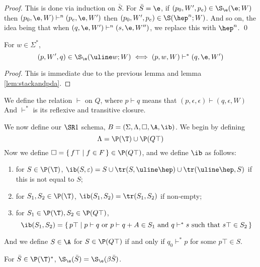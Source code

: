 \documentclass{llncs}
\begin{document}
\begin{proof}

    This is done via induction on $\bar S$.
    For $\bar S=\e$, if $(p_0,W',p_e)\in\S_\e(\e;W)$ then $(p_0,\e,W)\vdash^n(p_e,\e,W')$ then $(p_0,W',p_e)\in\S(\hep^n;W)$.
    And so on, the idea being that when $(q,\e,W')\vdash^n(s,\e,W'')$, we replace this with $\hep^n$.
    \qed

\end{proof}

\begin{lemma}

    For $w\in\Sigma^*$,
    $$ (p,W',q)\in\S_\e(\uline w;W) \iff (p,w,W)\vdash^*(q,\e,W') $$

\end{lemma}

\begin{proof}

    This is immediate due to the previous lemma and lemma \ref{lem:stackandpda}.

\end{proof}

We define the relation $\vdash$ on $Q$, where $p\vdash q$ means that $(p,\epsilon,\epsilon)\vdash(q,\epsilon,W)$
And $\vdash^*$ is its reflexive and transitive closure.

We now define our $\SR1$ schema, $B=(\Sigma,\Lambda,\square,\A,\ib)$.
We begin by defining
$$ \Lambda = \P(\T) \cup \P(Q\top) $$
Now we define $\square=\set{f\top}[f\in F]\in\P(Q\top)$, and we define $\ib$ as follows:
\begin{enumerate}
    \item for $S\in\P(\T)$, $\ib(S,\epsilon)=S\cup\tr(S,\uline\hep)\cup\tr(\uline\hep,S)$ if this is not equal to $S$;
    \item for $S_1,S_2\in\P(\T)$, $\ib(S_1,S_2)=\tr(S_1,S_2)$ if non-empty;
    \item for $S_1\in\P(\T),S_2\in\P(Q\top)$,
    $$ \ib(S_1,S_2)=\set{p\top}[\hbox{$p\vdash q$ or $p\vdash q+A\in S_1$ and $q\vdash^*s$ such that $s\top\in S_2$}] $$
\end{enumerate}
And we define $S\in\A$ for $S\in\P(Q\top)$ if and only if $q_0\vdash^*p$ for some $p\top\in S$.

\begin{lemma}

    For $\bar S\in\P(\T)^*$, $\S_\e(\bar S)=\S_\e(\beta\bar S)$.

\end{lemma}
\end{document}
